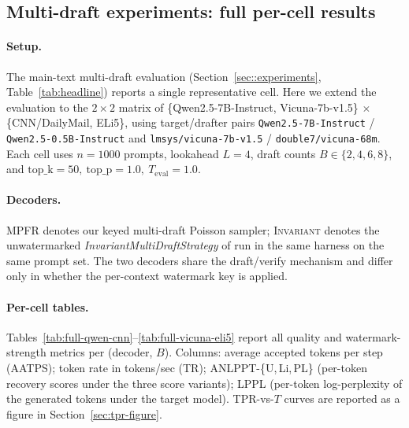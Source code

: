 \documentclass{article}
\theoremstyle{plain}
\theoremstyle{definition}
\begin{document}
\subsection{Multi-draft experiments: full per-cell results}
\label{sec:multi_draft}

\paragraph{Setup.}
The main-text multi-draft evaluation
(Section~\ref{sec::experiments}, Table~\ref{tab:headline}) reports a
single representative cell.  Here we extend the evaluation to the
$2{\times}2$ matrix of \{Qwen2.5-7B-Instruct, Vicuna-7b-v1.5\}
$\times$ \{CNN/DailyMail, ELi5\}, using target/drafter pairs
\texttt{Qwen2.5-7B-Instruct} / \texttt{Qwen2.5-0.5B-Instruct} and
\texttt{lmsys/vicuna-7b-v1.5} / \texttt{double7/vicuna-68m}.  Each cell
uses $n{=}1000$ prompts, lookahead $L{=}4$, draft counts
$B\in\{2,4,6,8\}$, and $\mathrm{top\_k}=50,\ \mathrm{top\_p}=1.0,\
T_{\mathrm{eval}}=1.0$.

\paragraph{Decoders.}
\textsc{MPFR} denotes our keyed multi-draft Poisson sampler;
\textsc{Invariant} denotes the unwatermarked
\emph{InvariantMultiDraftStrategy} of \citet{rowan2025list} run in the
same harness on the same prompt set.  The two decoders share the
draft/verify mechanism and differ only in whether the per-context
watermark key is applied.

\paragraph{Per-cell tables.}
Tables~\ref{tab:full-qwen-cnn}--\ref{tab:full-vicuna-eli5} report all
quality and watermark-strength metrics per (decoder, $B$).  Columns:
average accepted tokens per step (AATPS); token rate in tokens/sec
(TR); ANLPPT-\{U,\,Li,\,PL\} (per-token recovery scores under the
three score variants); LPPL (per-token log-perplexity of the generated
tokens under the target model).  TPR-vs-$T$ curves are reported as a
figure in Section~\ref{sec:tpr-figure}.
\end{document}

